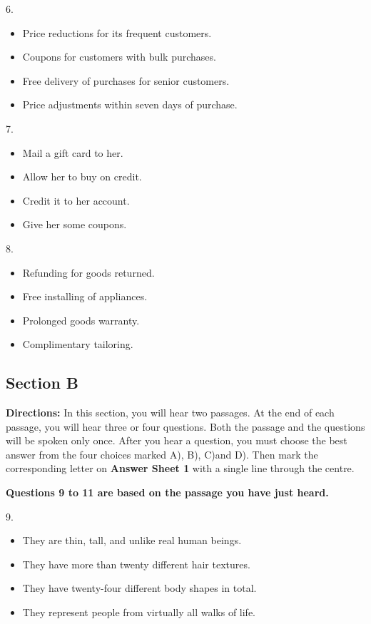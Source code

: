 \documentclass[UTF8,11pt]{ctexart}
\begin{document}
6.


\begin{itemize}[leftmargin=2em,itemsep=.2em,topsep=.4em]\item[A.] Price reductions for its frequent customers.
\item[B.] Coupons for customers with bulk purchases.
\item[C.] Free delivery of purchases for senior customers.
\item[D.] Price adjustments within seven days of purchase.
\end{itemize}

7.


\begin{itemize}[leftmargin=2em,itemsep=.2em,topsep=.4em]\item[A.] Mail a gift card to her.
\item[B.] Allow her to buy on credit.
\item[C.] Credit it to her account.
\item[D.] Give her some coupons.
\end{itemize}

8.


\begin{itemize}[leftmargin=2em,itemsep=.2em,topsep=.4em]\item[A.] Refunding for goods returned.
\item[B.] Free installing of appliances.
\item[C.] Prolonged goods warranty.
\item[D.] Complimentary tailoring.
\end{itemize}

\subsection*{\textbf{Section B}}


\textbf{Directions:} In this section, you will hear two passages. At the end of each passage, you will hear three or four questions. Both the passage and the questions will be spoken only once. After you hear a question, you must choose the best answer from the four choices marked A), B), C)and D). Then mark the corresponding letter on\textbf{ Answer Sheet 1} with a single line through the centre.


\textbf{Questions 9 to 11 are based on the passage you have just heard.}


9.


\begin{itemize}[leftmargin=2em,itemsep=.2em,topsep=.4em]\item[A.] They are thin, tall, and unlike real human beings.
\item[B.] They have more than twenty different hair textures.
\item[C.] They have twenty-four different body shapes in total.
\item[D.] They represent people from virtually all walks of life.
\end{itemize}
\end{document}
